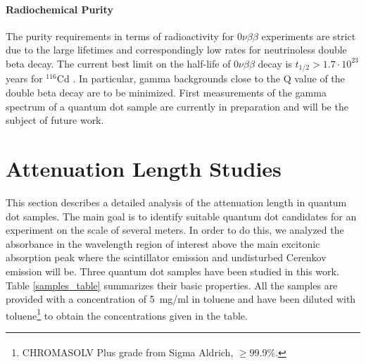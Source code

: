 \documentclass[cits]{JINST}
\begin{document}
\paragraph{Radiochemical Purity}
The purity requirements in terms of radioactivity for 0$\nu\beta\beta$ experiments are strict due to the large lifetimes and correspondingly low rates for neutrinoless double beta decay. The current best limit on the half-life of 0$\nu\beta\beta$ decay is $t_{1/2}>1.7\cdot10^{23}$ years for $^{116}$Cd \cite{solotvina}. In particular, gamma backgrounds close to the Q value of the double beta decay are to be minimized. First measurements of the gamma spectrum of a quantum dot sample are currently in preparation and will be the subject of future work.   

\section{Attenuation Length Studies}\label{Attenuation_length_section}
This section describes a detailed analysis of the attenuation length in quantum dot samples. The main goal is to identify suitable quantum dot candidates for an experiment on the scale of several meters. In order to do this, we analyzed the absorbance in the wavelength region of interest above the main excitonic absorption peak where the scintillator emission and undisturbed Cerenkov emission will be. Three quantum dot samples have been studied in this work. Table \ref{samples_table} summarizes their basic properties. All the samples are provided with a concentration of 5~mg/ml in toluene and have been diluted with toluene\footnote{CHROMASOLV\textsuperscript{\textregistered} Plus grade from Sigma Aldrich, $\geq$99.9\%.} to obtain the concentrations given in the table. 
\end{document}
